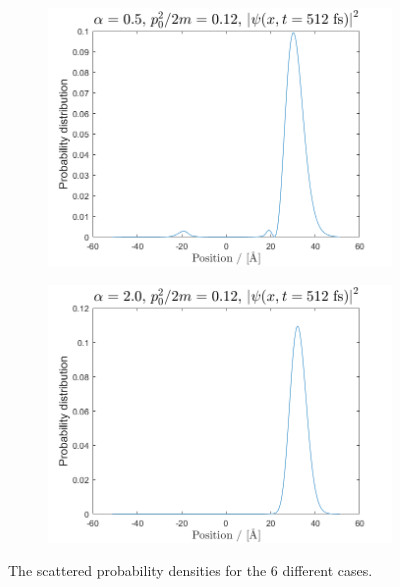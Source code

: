 \begin{figure}[H]
\begin{subfigure}[t]{0.47\textwidth}
	\includegraphics[width=\textwidth]{graphics/Task3/a1e3.png}
	\caption{}
	\label{fig:3_e}
\end{subfigure}
\begin{subfigure}[t]{0.47\textwidth}
	\includegraphics[width=\textwidth]{graphics/Task3/a2e3.png}
	\caption{}
	\label{fig:3_f}
\end{subfigure}

\caption{The scattered probability densities for the 6 different cases.}
\label{fig:3}
\end{figure}

